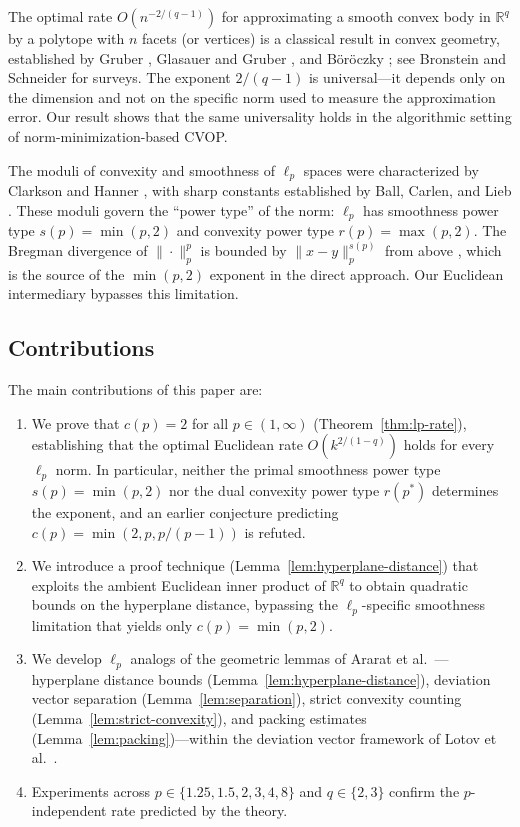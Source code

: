 \documentclass[11pt]{article}
\newcommand{\R}{\mathbb{R}}
\newcommand{\pstar}{p^*}
\begin{document}
The optimal rate $O(n^{-2/(q-1)})$ for approximating a smooth convex body in $\R^q$ by a polytope with $n$ facets (or vertices) is a classical result in convex geometry, established by Gruber \cite{Gruber1982,Gruber1993,Gruber1993a,Gruber1994}, Glasauer and Gruber \cite{Glasauer1997}, and B\"or\"oczky \cite{Boroczky2000}; see Bronstein \cite{Bronstein2008} and Schneider \cite[Chapter~2]{Schneider2013} for surveys. The exponent $2/(q-1)$ is universal---it depends only on the dimension and not on the specific norm used to measure the approximation error. Our result shows that the same universality holds in the algorithmic setting of norm-minimization-based CVOP.

The moduli of convexity and smoothness of $\ell_p$ spaces were characterized by Clarkson \cite{Clarkson1936} and Hanner \cite{Hanner1956}, with sharp constants established by Ball, Carlen, and Lieb \cite{Ball1994}. These moduli govern the ``power type'' of the norm: $\ell_p$ has smoothness power type $s(p) = \min(p, 2)$ and convexity power type $r(p) = \max(p, 2)$. The Bregman divergence of $\|\cdot\|_p^p$ is bounded by $\|x - y\|_p^{s(p)}$ from above \cite{Xu1991,Sprung2019}, which is the source of the $\min(p,2)$ exponent in the direct approach. Our Euclidean intermediary bypasses this limitation.

\subsection{Contributions}\label{sec:contributions}

The main contributions of this paper are:

\begin{enumerate}[label=(\arabic*)]
\item We prove that $c(p) = 2$ for all $p \in (1,\infty)$ (Theorem~\ref{thm:lp-rate}), establishing that the optimal Euclidean rate $O(k^{2/(1-q)})$ holds for every $\ell_p$ norm. In particular, neither the primal smoothness power type $s(p) = \min(p,2)$ nor the dual convexity power type $r(\pstar)$ determines the exponent, and an earlier conjecture predicting $c(p) = \min(2, p, p/(p-1))$ is refuted.

\item We introduce a proof technique (Lemma~\ref{lem:hyperplane-distance}) that exploits the ambient Euclidean inner product of $\R^q$ to obtain quadratic bounds on the hyperplane distance, bypassing the $\ell_p$-specific smoothness limitation that yields only $c(p) = \min(p,2)$.

\item We develop $\ell_p$ analogs of the geometric lemmas of Ararat et al.\ \cite[Section~7]{Ararat2024}---hyperplane distance bounds (Lemma~\ref{lem:hyperplane-distance}), deviation vector separation (Lemma~\ref{lem:separation}), strict convexity counting (Lemma~\ref{lem:strict-convexity}), and packing estimates (Lemma~\ref{lem:packing})---within the deviation vector framework of Lotov et al.\ \cite[Chapter~8]{Lotov2004}.

\item Experiments across $p \in \{1.25, 1.5, 2, 3, 4, 8\}$ and $q \in \{2, 3\}$ confirm the $p$-independent rate predicted by the theory.
\end{enumerate}
\end{document}
